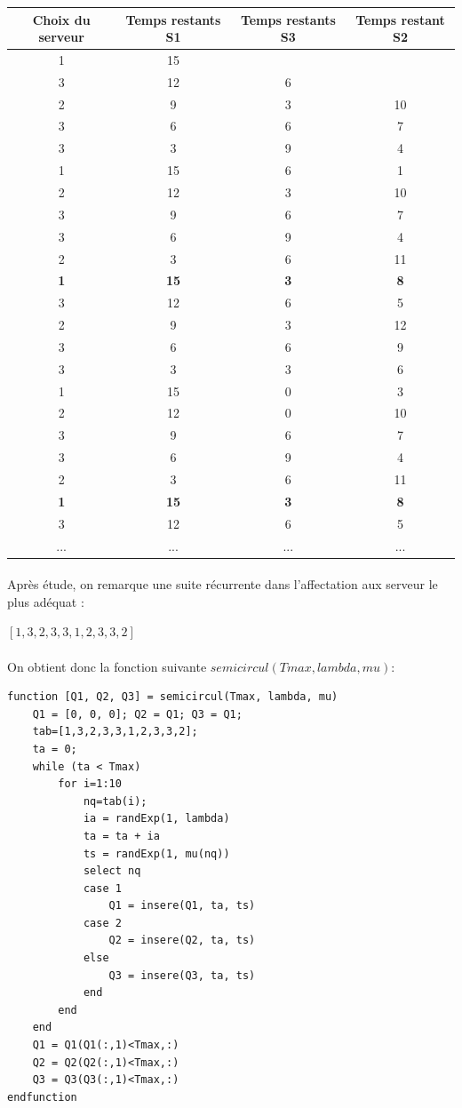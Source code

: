 \documentclass{article}
\begin{document}
\begin{tabular}{c|ccc}
	\hline \hline
	Choix du serveur & Temps restants S1 & Temps restants S3 & Temps restant S2 \\
	\hline 
	1 & 15 \\
	3 & 12 & 6 \\
	2 & 9 & 3 & 10 \\
	3 & 6 & 6 & 7 \\
	3 & 3 & 9 & 4 \\
	1 & 15 & 6 & 1 \\
	2 & 12 & 3 & 10 \\
	3 & 9 & 6 & 7 \\
	3 & 6 & 9 & 4 \\
	2 & 3 & 6 & 11 \\
	\hline
	\textbf{1} & \textbf{15} & \textbf{3} & \textbf{8} \\
	3 & 12 & 6 & 5 \\
	2 & 9 & 3 & 12 \\
	3 & 6 & 6 & 9 \\
	3 & 3 & 3 & 6 \\
	1 & 15 & 0 & 3 \\
	2 & 12 & 0 & 10 \\
	3 & 9 & 6 & 7 \\
	3 & 6 & 9 & 4 \\
	2 & 3 & 6 & 11 \\
	\hline
	\textbf{1} & \textbf{15} & \textbf{3} & \textbf{8} \\
	3 & 12 & 6 & 5 \\
	... & ... & ... & ... \\
	\hline \hline
\end{tabular}

\paragraph{}
Après étude, on remarque une suite récurrente dans l'affectation aux serveur le plus adéquat :

\begin{center}
	$[1,3,2,3,3,1,2,3,3,2]$
\end{center}
\paragraph{}On obtient donc la fonction suivante $semicircul(Tmax,lambda,mu)$:
\begin{verbatim}
function [Q1, Q2, Q3] = semicircul(Tmax, lambda, mu)
    Q1 = [0, 0, 0]; Q2 = Q1; Q3 = Q1;
    tab=[1,3,2,3,3,1,2,3,3,2];  
    ta = 0;
    while (ta < Tmax)
        for i=1:10
            nq=tab(i);
            ia = randExp(1, lambda) 
            ta = ta + ia 
            ts = randExp(1, mu(nq)) 
            select nq 
            case 1 
                Q1 = insere(Q1, ta, ts)
            case 2
                Q2 = insere(Q2, ta, ts)
            else
                Q3 = insere(Q3, ta, ts)
            end
        end
    end
    Q1 = Q1(Q1(:,1)<Tmax,:)
    Q2 = Q2(Q2(:,1)<Tmax,:) 
    Q3 = Q3(Q3(:,1)<Tmax,:) 
endfunction 
\end{verbatim}
\end{document}

